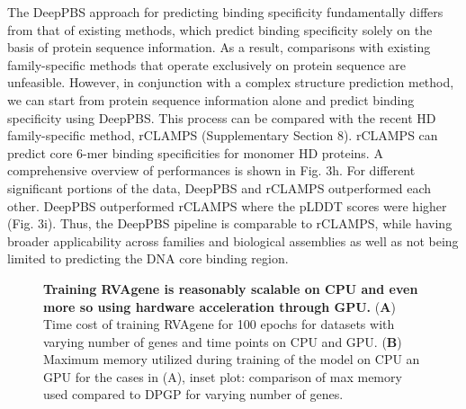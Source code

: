 The DeepPBS approach for predicting binding specificity fundamentally differs from that of existing methods, which predict binding specificity solely on the basis of protein sequence information. As a result, comparisons with existing family-specific methods that operate exclusively on protein sequence are unfeasible. However, in conjunction with a complex structure prediction method, we can start from protein sequence information alone and predict binding specificity using DeepPBS. This process can be compared with the recent HD family-specific method, rCLAMPS \citep{Wetzel2022} (Supplementary Section 8). rCLAMPS can predict core 6-mer binding specificities for monomer HD proteins. A comprehensive overview of performances is shown in Fig. 3h. For different significant portions of the data, DeepPBS and rCLAMPS outperformed each other. DeepPBS outperformed rCLAMPS where the pLDDT scores were higher (Fig. 3i). Thus, the DeepPBS pipeline is comparable to rCLAMPS, while having broader applicability across families and biological assemblies as well as not being limited to predicting the DNA core binding region.

\begin{center}
    \begin{figure}
        \caption[Computational cost of training RVAgene]{\textbf{Training RVAgene is reasonably scalable on CPU and even more so using hardware acceleration through GPU.} ({\bf A}) Time cost of training RVAgene for 100 epochs for datasets with varying number of genes and time points on CPU and GPU. ({\bf B}) Maximum memory utilized during training of the model on CPU an GPU for the cases in (A), inset plot: comparison of max memory used compared to DPGP for varying number of genes.}
  \label{fig:pdna3}
\end{figure}
\end{center}

